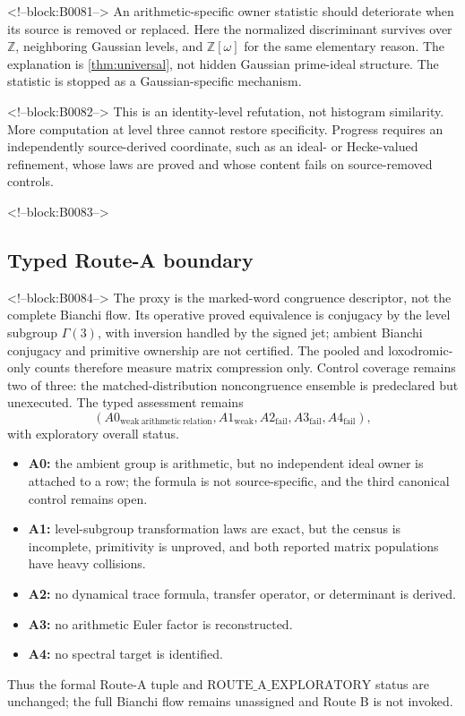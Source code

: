 \documentclass[11pt,a4paper]{article}
\theoremstyle{definition}
\theoremstyle{remark}
\newcommand{\Eis}{\mathbb{Z}[\omega]}
\begin{document}
<!--block:B0081-->
An arithmetic-specific owner statistic should deteriorate when its source is removed or replaced. Here the normalized discriminant survives over \(\mathbb Z\), neighboring Gaussian levels, and \(\Eis\) for the same elementary reason. The explanation is \cref{thm:universal}, not hidden Gaussian prime-ideal structure. The statistic is stopped as a Gaussian-specific mechanism.

<!--block:B0082-->
This is an identity-level refutation, not histogram similarity. More computation at level three cannot restore specificity. Progress requires an independently source-derived coordinate, such as an ideal- or Hecke-valued refinement, whose laws are proved and whose content fails on source-removed controls.

<!--block:B0083-->
\subsection{Typed Route-A boundary}

<!--block:B0084-->
The proxy is the marked-word congruence descriptor, not the complete Bianchi flow. Its operative proved equivalence is conjugacy by the level subgroup \(\Gamma(3)\), with inversion handled by the signed jet; ambient Bianchi conjugacy and primitive ownership are not certified. The pooled and loxodromic-only counts therefore measure matrix compression only. Control coverage remains two of three: the matched-distribution noncongruence ensemble is predeclared but unexecuted. The typed assessment remains
\[
 (A0_{\mathrm{weak\ arithmetic\ relation}},
 A1_{\mathrm{weak}},A2_{\mathrm{fail}},A3_{\mathrm{fail}},A4_{\mathrm{fail}}),
\]
with exploratory overall status.
\begin{itemize}
 \item \textbf{A0:} the ambient group is arithmetic, but no independent ideal owner is attached to a row; the formula is not source-specific, and the third canonical control remains open.
 \item \textbf{A1:} level-subgroup transformation laws are exact, but the census is incomplete, primitivity is unproved, and both reported matrix populations have heavy collisions.
 \item \textbf{A2:} no dynamical trace formula, transfer operator, or determinant is derived.
 \item \textbf{A3:} no arithmetic Euler factor is reconstructed.
 \item \textbf{A4:} no spectral target is identified.
\end{itemize}
Thus the formal Route-A tuple and \(\mathrm{ROUTE\_A\_EXPLORATORY}\) status are unchanged; the full Bianchi flow remains unassigned and Route B is not invoked.
\end{document}
